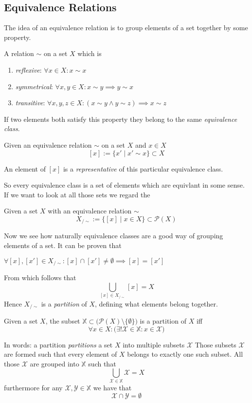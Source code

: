 \subsection{Equivalence Relations}
The idea of an equivalence relation is to group elements of a set together by some property.
\begin{definition}\label{def:equivalence_relation}
   A relation \(\sim\) on a set \(X\) which is
   \begin{enumerate}[label=\roman*, align=Center]
      \item \textit{reflexive}: \(\forall x \in X: x \sim x\)
      \item \textit{symmetrical}: \(\forall x, y \in X: x \sim y \implies y \sim x\)
      \item \textit{transitive}: \(\forall x, y, z \in X: (x \sim y \land y \sim z) \implies x \sim z\)
   \end{enumerate}
\end{definition}
If two elements both satisfy this property they belong to the same \emph{equivalence class}.
\begin{definition}
   Given an equivalence relation \(\sim\) on a set \(X\) and \(x \in X\)
   \[[x] := \{x' \mid x' \sim x\} \subset X\]
\end{definition}
\begin{remark}
   An element of \([x]\) is a \emph{representative} of this particular equivalence class.
\end{remark}
So every equivalence class is a set of elements which are equivlant in some sense.
If we want to look at all those sets we regard the
\begin{definition}
   Given a set \(X\) with an equivalence relation \(\sim\)
   \[X_{/\sim} := \big\{[x] \mid x \in X \big\} \subset \mathcal{P}(X)\]
\end{definition}
Now we see how naturally equivalence classes are a good way of grouping elements of a set.
It can be proven that
\begin{theorem}
   \(\forall [x], [x'] \in X_{/\sim}: [x] \cap [x'] \neq \emptyset \implies [x] = [x']\)
\end{theorem}
From which follows that
\[\bigcup_{[x] \in X_{/\sim}} [x] = X\]
Hence \(X_{/\sim}\) is a \emph{partition} of \(X\), defining what elements belong together.
\begin{definition}[Partition]
   Given a set \(X\), the subset \(\mathbb{X} \subset \big(\mathcal{P}(X) \setminus \{\emptyset\}\big)\) is a partition of \(X\) iff
   \[\forall x \in X: \big(\exists! \mathcal{X} \in \mathbb{X}: x \in \mathcal{X}\big)\]
\end{definition}
\begin{remark}
   In words: a partition \emph{partitions} a set \(X\) into multiple subsets \(\mathcal{X}\)
   Those subsets \(\mathcal{X}\) are formed such that every element of \(X\) belongs to exactly one such subset.
   All those \(\mathcal{X}\) are grouped into \(\mathbb{X}\) such that
   \[\bigcup_{\mathcal{X} \in \mathbb{X}} \mathcal{X} = X\]
   furthermore for any \(\mathcal{X}, \mathcal{Y} \in \mathbb{X}\) we have that
   \[\mathcal{X} \cap \mathcal{Y} = \emptyset\]
\end{remark}

